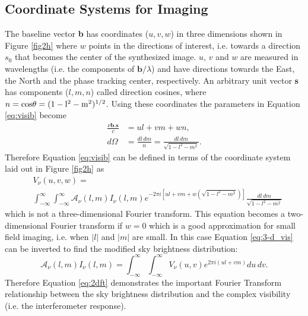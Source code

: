\subsection{Coordinate Systems for Imaging}\label{subsec:7}
The baseline vector \textbf{b} has coordinates ($u,v,w$) in three dimensions shown in Figure \ref{fig2h} where $w$ points in the directions of interest, i.e. towards a direction \textbf{$s_{0}$} that becomes the center of the synthesized image. $u$, $v$ and $w$ are measured in wavelengths (i.e. the components of $\textbf{b}/\lambda$) and have directions towards the East, the North and the phase tracking center, respectively. An arbitrary unit vector \textbf{s} has components ($l,m,n$) called direction cosines, where $n=\rm{cos}\theta=(1-l^2-m^2)^{1/2}$. Using these coordinates the parameters in Equation \ref{eq:visib} become
\begin{equation}
\begin{split}
\frac{\nu \textbf{b}.\textbf{s}}{c}&=ul+vm+wn, \\
d\Omega &= \frac{dl\,dm}{n}=\frac{dl\,dm}{\sqrt{1-l^2-m^2}}.
\end{split}
\end{equation}
Therefore Equation \ref{eq:visib} can be defined in terms of the coordinate system laid out in Figure \ref{fig2h} as
\begin{equation}\label{eq:3-d_vis}
\begin{split}
&V_{\nu}(u,v,w)=\\
&\int ^{\infty}_{-\infty}\int ^{\infty}_{-\infty} \mathcal{A}_{\nu}(l,m)I_{\nu}(l,m)\mathit{e}^{-2\pi \mathit{i}[ul+vm+w(\sqrt{1-l^2-m^2})] }\frac{dl\,dm}{\sqrt{1-l^2-m^2}}
\end{split}
\end{equation}
which is not a three-dimensional Fourier transform. This equation becomes a two-dimensional Fourier transform if $w=0$ which is a good approximation for small field imaging, i.e. when $|l|$ and $|m|$ are small. In this case Equation \ref{eq:3-d_vis} can be inverted to find the modified sky brightness distribution:
\begin{equation}\label{eq:2dft}
\mathcal{A}_{\nu}(l,m)I_{\nu}(l,m)=\int ^{\infty}_{-\infty}\int ^{\infty}_{-\infty}V_{\nu}(u,v)\mathit{e}^{2\pi \mathit{i}(ul+vm)}du\,dv.
\end{equation}
Therefore Equation \ref{eq:2dft} demonstrates the important Fourier Transform relationship between the sky brightness distribution and the complex visibility (i.e. the interferometer response).

